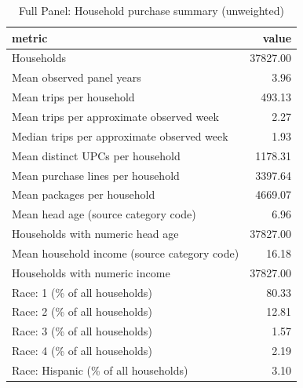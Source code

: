 \begin{table}
\caption{Full Panel: Household purchase summary (unweighted)}
\begin{tabular}{lr}
\toprule
metric & value \\
\midrule
Households & 37827.00 \\
Mean observed panel years & 3.96 \\
Mean trips per household & 493.13 \\
Mean trips per approximate observed week & 2.27 \\
Median trips per approximate observed week & 1.93 \\
Mean distinct UPCs per household & 1178.31 \\
Mean purchase lines per household & 3397.64 \\
Mean packages per household & 4669.07 \\
Mean head age (source category code) & 6.96 \\
Households with numeric head age & 37827.00 \\
Mean household income (source category code) & 16.18 \\
Households with numeric income & 37827.00 \\
Race: 1 (\% of all households) & 80.33 \\
Race: 2 (\% of all households) & 12.81 \\
Race: 3 (\% of all households) & 1.57 \\
Race: 4 (\% of all households) & 2.19 \\
Race: Hispanic (\% of all households) & 3.10 \\
\bottomrule
\end{tabular}
\end{table}
